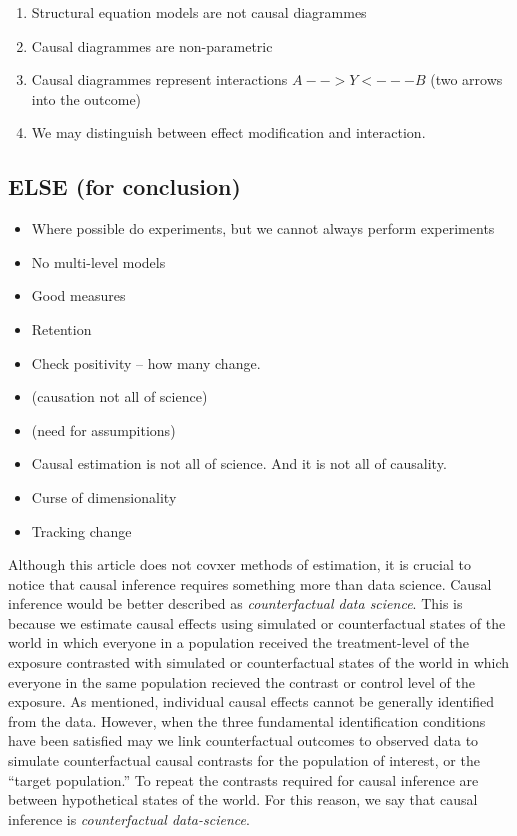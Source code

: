\documentclass[
  singlecolumn]{report}
\providecommand{\tightlist}{%
  \setlength{\itemsep}{0pt}\setlength{\parskip}{0pt}}\usepackage{longtable,booktabs,array}
\begin{document}
\begin{enumerate}
\def\labelenumi{\arabic{enumi}.}
\tightlist
\item
  Structural equation models are not causal diagrammes
\item
  Causal diagrammes are non-parametric
\item
  Causal diagrammes represent interactions \(A -- > Y <--- B\) (two
  arrows into the outcome)
\item
  We may distinguish between effect modification and interaction.
\end{enumerate}

\hypertarget{else-for-conclusion}{%
\subsection{ELSE (for conclusion)}\label{else-for-conclusion}}

\begin{itemize}
\tightlist
\item
  Where possible do experiments, but we cannot always perform
  experiments\\
\item
  No multi-level models
\item
  Good measures
\item
  Retention
\item
  Check positivity -- how many change.
\item
  (causation not all of science)
\item
  (need for assumpitions)
\item
  Causal estimation is not all of science. And it is not all of
  causality.
\item
  Curse of dimensionality
\item
  Tracking change
\end{itemize}

Although this article does not covxer methods of estimation, it is
crucial to notice that causal inference requires something more than
data science. Causal inference would be better described as
\emph{counterfactual data science}. This is because we estimate causal
effects using simulated or counterfactual states of the world in which
everyone in a population received the treatment-level of the exposure
contrasted with simulated or counterfactual states of the world in which
everyone in the same population recieved the contrast or control level
of the exposure. As mentioned, individual causal effects cannot be
generally identified from the data. However, when the three fundamental
identification conditions have been satisfied may we link counterfactual
outcomes to observed data to simulate counterfactual causal contrasts
for the population of interest, or the ``target population.'' To repeat
the contrasts required for causal inference are between hypothetical
states of the world. For this reason, we say that causal inference is
\emph{counterfactual data-science}.
\end{document}
